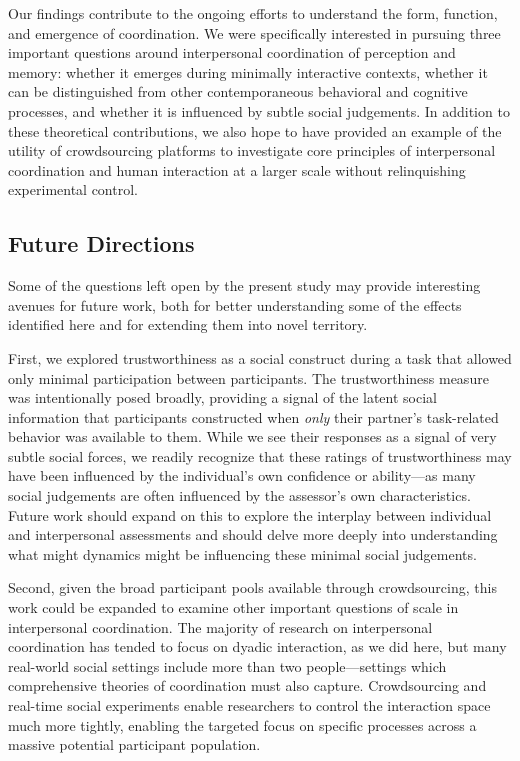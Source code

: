 \documentclass[10pt, letterpaper]{article}
\begin{document}
Our findings contribute to the ongoing efforts to understand the form,
function, and emergence of coordination. We were specifically interested
in pursuing three important questions around interpersonal coordination
of perception and memory: whether it emerges during minimally
interactive contexts, whether it can be distinguished from other
contemporaneous behavioral and cognitive processes, and whether it is
influenced by subtle social judgements. In addition to these theoretical
contributions, we also hope to have provided an example of the utility
of crowdsourcing platforms to investigate core principles of
interpersonal coordination and human interaction at a larger scale
without relinquishing experimental control.

\subsection{Future Directions}\label{future-directions}

Some of the questions left open by the present study may provide
interesting avenues for future work, both for better understanding some
of the effects identified here and for extending them into novel
territory.

First, we explored trustworthiness as a social construct during a task
that allowed only minimal participation between participants. The
trustworthiness measure was intentionally posed broadly, providing a
signal of the latent social information that participants constructed
when \emph{only} their partner's task-related behavior was available to
them. While we see their responses as a signal of very subtle social
forces, we readily recognize that these ratings of trustworthiness may
have been influenced by the individual's own confidence or ability---as
many social judgements are often influenced by the assessor's own
characteristics. Future work should expand on this to explore the
interplay between individual and interpersonal assessments and should
delve more deeply into understanding what might dynamics might be
influencing these minimal social judgements.

Second, given the broad participant pools available through
crowdsourcing, this work could be expanded to examine other important
questions of scale in interpersonal coordination. The majority of
research on interpersonal coordination has tended to focus on dyadic
interaction, as we did here, but many real-world social settings include
more than two people---settings which comprehensive theories of
coordination must also capture. Crowdsourcing and real-time social
experiments enable researchers to control the interaction space much
more tightly, enabling the targeted focus on specific processes across a
massive potential participant population.
\end{document}
